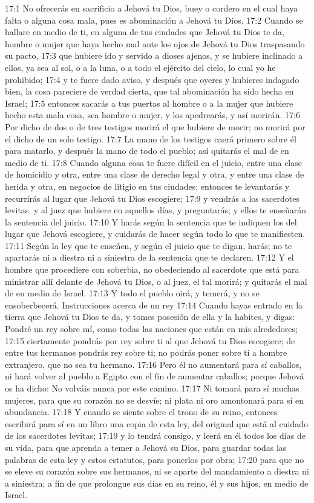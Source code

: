 17:1 No ofrecerás en sacrificio a Jehová tu Dios, buey o cordero en el cual haya falta o alguna cosa mala, pues es abominación a Jehová tu Dios.  
17:2 Cuando se hallare en medio de ti, en alguna de tus ciudades que Jehová tu Dios te da, hombre o mujer que haya hecho mal ante los ojos de Jehová tu Dios traspasando su pacto,  
17:3 que hubiere ido y servido a dioses ajenos, y se hubiere inclinado a ellos, ya sea al sol, o a la luna, o a todo el ejército del cielo, lo cual yo he prohibido;  
17:4 y te fuere dado aviso, y después que oyeres y hubieres indagado bien, la cosa pareciere de verdad cierta, que tal abominación ha sido hecha en Israel;  
17:5 entonces sacarás a tus puertas al hombre o a la mujer que hubiere hecho esta mala cosa, sea hombre o mujer, y los apedrearás, y así morirán.  
17:6 Por dicho de dos o de tres testigos morirá el que hubiere de morir; no morirá por el dicho de un solo testigo.  
17:7 La mano de los testigos caerá primero sobre él para matarlo, y después la mano de todo el pueblo; así quitarás el mal de en medio de ti.  
17:8 Cuando alguna cosa te fuere difícil en el juicio, entre una clase de homicidio y otra, entre una clase de derecho legal y otra, y entre una clase de herida y otra, en negocios de litigio en tus ciudades; entonces te levantarás y recurrirás al lugar que Jehová tu Dios escogiere;  
17:9 y vendrás a los sacerdotes levitas, y al juez que hubiere en aquellos días, y preguntarás; y ellos te enseñarán la sentencia del juicio.  
17:10 Y harás según la sentencia que te indiquen los del lugar que Jehová escogiere, y cuidarás de hacer según todo lo que te manifiesten.  
17:11 Según la ley que te enseñen, y según el juicio que te digan, harás; no te apartarás ni a diestra ni a siniestra de la sentencia que te declaren.  
17:12 Y el hombre que procediere con soberbia, no obedeciendo al sacerdote que está para ministrar allí delante de Jehová tu Dios, o al juez, el tal morirá; y quitarás el mal de en medio de Israel.  
17:13 Y todo el pueblo oirá, y temerá, y no se ensoberbecerá.  
Instrucciones acerca de un rey  
17:14 Cuando hayas entrado en la tierra que Jehová tu Dios te da, y tomes posesión de ella y la habites, y digas: Pondré un rey sobre mí, como todas las naciones que están en mis alrededores;  
17:15 ciertamente pondrás por rey sobre ti al que Jehová tu Dios escogiere; de entre tus hermanos pondrás rey sobre ti; no podrás poner sobre ti a hombre extranjero, que no sea tu hermano.  
17:16 Pero él no aumentará para sí caballos, ni hará volver al pueblo a Egipto con el fin de aumentar caballos; porque Jehová os ha dicho: No volváis nunca por este camino.  
17:17 Ni tomará para sí muchas mujeres, para que su corazón no se desvíe; ni plata ni oro amontonará para sí en abundancia. 
17:18 Y cuando se siente sobre el trono de su reino, entonces escribirá para sí en un libro una copia de esta ley, del original que está al cuidado de los sacerdotes levitas;  
17:19 y lo tendrá consigo, y leerá en él todos los días de su vida, para que aprenda a temer a Jehová su Dios, para guardar todas las palabras de esta ley y estos estatutos, para ponerlos por obra;  
17:20 para que no se eleve su corazón sobre sus hermanos, ni se aparte del mandamiento a diestra ni a siniestra; a fin de que prolongue sus días en su reino, él y sus hijos, en medio de Israel. 
  
